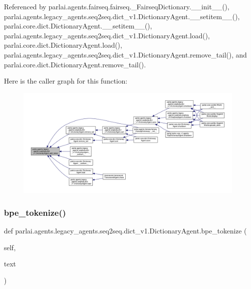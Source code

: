 Referenced by parlai.\+agents.\+fairseq.\+fairseq.\+\_\+\+Fairseq\+Dictionary.\+\_\+\+\_\+init\+\_\+\+\_\+(), parlai.\+agents.\+legacy\+\_\+agents.\+seq2seq.\+dict\+\_\+v1.\+Dictionary\+Agent.\+\_\+\+\_\+setitem\+\_\+\+\_\+(), parlai.\+core.\+dict.\+Dictionary\+Agent.\+\_\+\+\_\+setitem\+\_\+\+\_\+(), parlai.\+agents.\+legacy\+\_\+agents.\+seq2seq.\+dict\+\_\+v1.\+Dictionary\+Agent.\+load(), parlai.\+core.\+dict.\+Dictionary\+Agent.\+load(), parlai.\+agents.\+legacy\+\_\+agents.\+seq2seq.\+dict\+\_\+v1.\+Dictionary\+Agent.\+remove\+\_\+tail(), and parlai.\+core.\+dict.\+Dictionary\+Agent.\+remove\+\_\+tail().

Here is the caller graph for this function\+:
\nopagebreak
\begin{figure}[H]
\begin{center}
\leavevmode
\includegraphics[width=350pt]{classparlai_1_1agents_1_1legacy__agents_1_1seq2seq_1_1dict__v1_1_1DictionaryAgent_a35a084bb500ce45aa52786cdeddc49d7_icgraph}
\end{center}
\end{figure}
\mbox{\label{classparlai_1_1agents_1_1legacy__agents_1_1seq2seq_1_1dict__v1_1_1DictionaryAgent_aab883c9615677cd9ecfa921cd4994081}} 
\subsubsection{\texorpdfstring{bpe\+\_\+tokenize()}{bpe\_tokenize()}}
{\footnotesize\ttfamily def parlai.\+agents.\+legacy\+\_\+agents.\+seq2seq.\+dict\+\_\+v1.\+Dictionary\+Agent.\+bpe\+\_\+tokenize (\begin{DoxyParamCaption}\item[{}]{self,  }\item[{}]{text }\end{DoxyParamCaption})}

